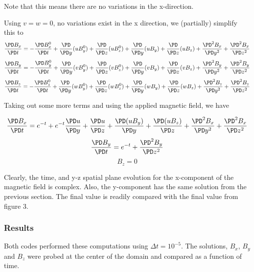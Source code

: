 \documentclass[11pt]{article}
\begin{document}
Note that this means there are no variations in the x-direction.

Using $v=w=0$, no variations exist in the x direction, we (partially) simplify this to
\begin{equation}
	\frac{\PD B_x}{\PD t}
	=
	-\frac{\PD B_x^0}{\PD t}
	+\frac{\PD}{\PD y} (u B_y^0)
	+\frac{\PD}{\PD z} (u B_z^0) \\
	+\frac{\PD}{\PD y} (u B_y)
	+\frac{\PD}{\PD z} (u B_z)
	+\frac{\PD^2 B_x}{\PD y^2}
	+\frac{\PD^2 B_x}{\PD z^2}
\end{equation}
\begin{equation}
	\frac{\PD B_y}{\PD t}
	=
	-\frac{\PD B_y^0}{\PD t}
	+\frac{\PD}{\PD y} (v B_y^0)
	+\frac{\PD}{\PD z} (v B_z^0) \\
	+\frac{\PD}{\PD y} (v B_y)
	+\frac{\PD}{\PD z} (v B_z)
	+\frac{\PD^2 B_y}{\PD y^2}
	+\frac{\PD^2 B_y}{\PD z^2}
\end{equation}
\begin{equation}
	\frac{\PD B_z}{\PD t}
	=
	-\frac{\PD B_z^0}{\PD t}
	+\frac{\PD}{\PD y} (w B_y^0)
	+\frac{\PD}{\PD z} (w B_z^0) \\
	+\frac{\PD}{\PD y} (w B_y)
	+\frac{\PD}{\PD z} (w B_z)
	+\frac{\PD^2 B_z}{\PD y^2}
	+\frac{\PD^2 B_z}{\PD z^2}
\end{equation}

Taking out some more terms and using the applied magnetic field, we have

\begin{equation}
	\frac{\PD B_x}{\PD t}
	=
	e^{-t}
	+e^{-t}\frac{\PD u}{\PD y}
	+\frac{\PD u}{\PD z} \\
	+\frac{\PD (u B_y)}{\PD y}
	+\frac{\PD (u B_z)}{\PD z}
	+\frac{\PD^2 B_x}{\PD y^2}
	+\frac{\PD^2 B_x}{\PD z^2}
\end{equation}
\begin{equation}
	\frac{\PD B_y}{\PD t}
	=
	e^{-t}
	+\frac{\PD^2 B_y}{\PD z^2}
\end{equation}
\begin{equation}
	B_z = 0
\end{equation}


Clearly, the time, and y-z spatial plane evolution for the x-component of the magnetic field is complex. Also, the y-component has the same solution from the previous section. The final value is readily compared with the final value from figure 3.


\subsubsection{Results}
Both codes performed these computations using $\Delta t = 10^{-5}$. The solutions, $B_x$, $B_y$ and $B_z$ were probed at the center of the domain and compared as a function of time.
\end{document}
